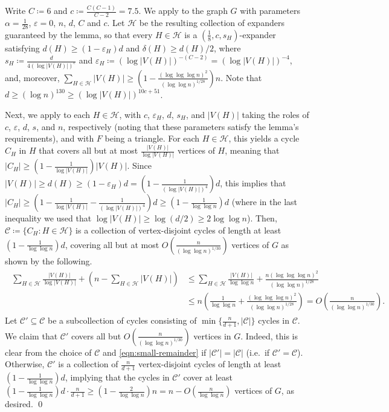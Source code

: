 \documentclass[10pt]{article}
\theoremstyle{plain}
\numberwithin{theorem}{section}
\theoremstyle{definition}
\theoremstyle{remark}
\renewenvironment{proof}[1][]{\begin{trivlist}
\item[\hspace{\labelsep}{\bf\noindent Proof#1.\/}] }{\qed\end{trivlist}}
\newcommand{\cH}{\mathcal{H}}
\newcommand{\cC}{\mathcal{C}}
\newcommand{\eps}{\varepsilon}
\theoremstyle{plain}
\begin{document}
\begin{proof}[ of \Cref{thm:cycle-partition}]
	Write $C \coloneqq 6$ and $c \coloneqq \frac{C(C-1)}{C-2} = 7.5$. We apply  to the graph $G$ with parameters $\alpha = \frac{1}{28}$, $\eps = 0$, $n$, $d$, $C$ and $c$. Let $\cH$ be the resulting collection of expanders guaranteed by the lemma, so that every $H \in \cH$ is a $(\frac{1}{8}, c, s_H)$-expander satisfying $d(H) \ge (1 - \eps_H) d$ and $\delta(H) \ge d(H)/2$, where $s_H \coloneqq \frac{d}{4 (\log |V(H)|)^{c}}$ and $\eps_H \coloneqq (\log |V(H)|)^{-(C - 2)} = (\log |V(H)|)^{-4}$, and, moreover, $\sum_{H \in \cH}|V(H)| \ge (1 - \frac{(\log \log \log n)^2}{(\log \log n)^{1/28}})n$. Note that $d \ge (\log n)^{130} \ge (\log |V(H)|)^{10c+51}$.

	Next, we apply  to each $H \in \cH$, with $c$, $\eps_H$, $d$, $s_H$, and $|V(H)|$ taking the roles of $c$, $\eps$, $d$, $s$, and $n$, respectively (noting that these parameters satisfy the lemma's requirements), and with $F$ being a triangle. For each $H \in \cH$, this yields a cycle $C_H$ in $H$ that covers all but at most $\frac{|V(H)|}{\log |V(H)|}$ vertices of $H$, meaning that $|C_H| \ge (1 - \frac{1}{\log |V(H)|})|V(H)|$. Since $|V(H)| \ge d(H) \ge (1 - \eps_H)d = (1 - \frac{1}{(\log |V(H)|)^4})d$, this implies that $|C_H| \ge (1 - \frac{1}{\log |V(H)|} - \frac{1}{(\log |V(H)|)^4})d \ge (1 - \frac{1}{\log \log n})d$ (where in the last inequality we used that $\log |V(H)| \ge \log (d/2) \ge 2\log \log n$). Then, $\cC \coloneqq \{C_H : H \in \cH\}$ is a collection of vertex-disjoint cycles of length at least $(1 - \frac{1}{\log \log n})d$, covering all but at most $O\left(\frac{n}{(\log \log n)^{1/30}}\right)$ vertices of $G$ as shown by the following.
	\begin{align} \label{eqn:small-remainder}
		\begin{split}
		\sum_{H \in \cH}\frac{|V(H)|}{\log |V(H)|} + \left(n - \sum_{H \in \cH} |V(H)|\right)
		& \le \sum_{H \in \cH}\frac{|V(H)|}{\log \log n} + \frac{n (\log \log \log n)^2}{(\log \log n)^{1/28}} \\
		& \le n \left(\frac{1}{\log \log n} + \frac{(\log \log \log n)^2}{(\log \log n)^{1/28}}\right)
		= O\left(\frac{n}{(\log \log n)^{1/30}}\right).
		\end{split}
	\end{align}
	Let $\cC' \subseteq \cC$ be a subcollection of cycles consisting of $\min\{\frac{n}{d+1}, |\cC|\}$ cycles in $\cC$. We claim that $\cC'$ covers all but $O(\frac{n}{(\log \log n)^{1/30}})$ vertices in $G$. Indeed, this is clear from the choice of $\cC$ and \eqref{eqn:small-remainder} if $|\cC'| = |\cC|$ (i.e.\ if $\cC' = \cC$). Otherwise, $\cC'$ is a collection of $\frac{n}{d+1}$ vertex-disjoint cycles of length at least $(1 - \frac{1}{\log \log n})d$, implying that the cycles in $\cC'$ cover at least $(1 - \frac{1}{\log \log n}) d \cdot \frac{n}{d+1} \ge (1 - \frac{2}{\log \log n}) n = n - O(\frac{n}{\log \log n})$ vertices of $G$, as desired.
\end{proof}
\end{document}
